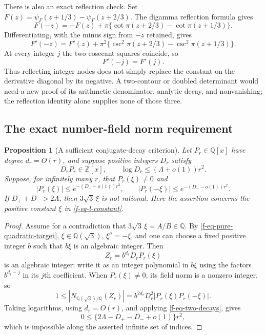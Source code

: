 \documentclass[11pt,a4paper]{article}
\newtheorem{proposition}[theorem]{Proposition}
\theoremstyle{definition}
\theoremstyle{remark}
\begin{document}
There is also an exact reflection check.  Set
$F(z)=\psi_\Gamma(z+1/3)-\psi_\Gamma(z+2/3)$.  The digamma reflection
formula gives
\begin{equation}
 F(-z)=-F(z)+\pi\{\cot\pi(z+2/3)-\cot\pi(z+1/3)\}.
 \label{f-eq-reflection}
\end{equation}
Differentiating, with the minus sign from $-z$ retained, gives
\begin{equation}
 F'(-z)=F'(z)+\pi^2\{
 \csc^2\pi(z+2/3)-\csc^2\pi(z+1/3)\}.
 \label{f-eq-reflection-derivative}
\end{equation}
At every integer $j$ the two cosecant squares coincide, so
\begin{equation}
 F'(-j)=F'(j).
 \label{f-eq-reflection-integers}
\end{equation}
Thus reflecting integer nodes does not simply replace the constant on the
derivative diagonal by its negative.  A two-contour or doubled determinant
would need a new proof of its arithmetic denominator, analytic decay, and
nonvanishing; the reflection identity alone supplies none of those three.

\subsection{The exact number-field norm requirement}
\label{f-sub-norm-barrier}

\begin{proposition}[A sufficient conjugate-decay criterion]
\label{f-prop-norm-criterion}
Let $P_r\in\mathbb Q[x]$ have degree $d_r=O(r)$, and suppose positive
integers $D_r$ satisfy
\[
 D_rP_r\in\mathbb Z[x],\qquad
 \log D_r\le(\Lambda+o(1))r^2.
\]
Suppose, for infinitely many $r$, that $P_r(\xi)\ne0$ and
\begin{equation}
 |P_r(\xi)|\le e^{-(D_+-o(1))r^2},\qquad
 |P_r(-\xi)|\le e^{-(D_--o(1))r^2}.
 \label{f-eq-two-decays}
\end{equation}
If $D_++D_->2\Lambda$, then $3\sqrt3\,\xi$ is not rational.
Here the assertion concerns the positive constant $\xi$ in
\eqref{f-eq-l-constant}.
\end{proposition}

\begin{proof}
Assume for a contradiction that $3\sqrt3\,\xi=A/B\in\mathbb Q$.
By \eqref{f-eq-pure-quadratic-target}, $\xi\in\mathbb Q(\sqrt3)$,
$\xi^\sigma=-\xi$, and one can choose a fixed positive integer $b$
such that $b\xi$ is an algebraic integer.  Then
\[
 Z_r=b^{d_r}D_rP_r(\xi)
\]
is an algebraic integer: write it as an integer polynomial in $b\xi$
using the factors $b^{d_r-j}$ in its $j$th coefficient.  When
$P_r(\xi)\ne0$, its field norm is a nonzero integer, so
\[
 1\le|N_{\mathbb Q(\sqrt3)/\mathbb Q}(Z_r)|
 =b^{2d_r}D_r^2|P_r(\xi)P_r(-\xi)|.
\]
Taking logarithms, using $d_r=O(r)$, and applying
\eqref{f-eq-two-decays}, gives
\[
 0\le\{2\Lambda-D_+-D_-+o(1)\}r^2,
\]
which is impossible along the asserted infinite set of indices.
\end{proof}
\end{document}
